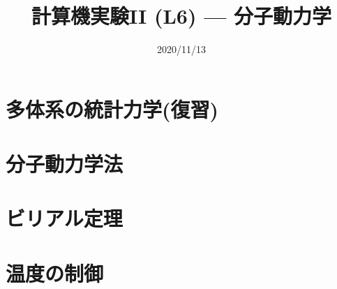 \documentclass[10pt,dvipdfmx]{beamer}
\title{計算機実験II (L6) --- 分子動力学}
\date{2020/11/13}
\begin{document}
\begin{frame}
  \titlepage
  \tableofcontents
\end{frame}





\section{多体系の統計力学(復習)}






\section{分子動力学法}





\section{ビリアル定理}





\section{温度の制御}








%



\end{document}
